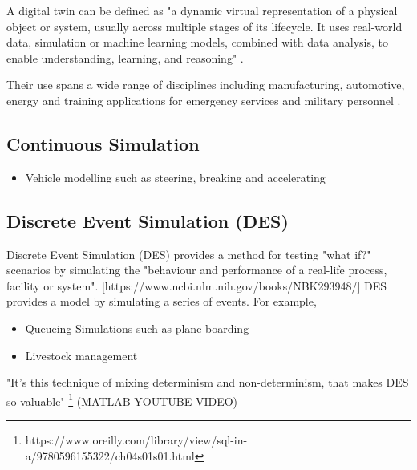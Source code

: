 \documentclass{article}
\begin{document}
A digital twin can be defined as "a dynamic virtual representation of a physical object or system, usually across multiple stages of its lifecycle. It uses real-world data, simulation or machine learning models, combined with data analysis, to enable understanding, learning, and reasoning" \cite{stanford2019digital}. 

Their use spans a wide range of disciplines including manufacturing, automotive, energy \cite{PYLIANIDIS2021105942}
 and training applications for emergency services \cite{ScientificReports1} and military personnel \cite{9345490}. 

\subsection{Continuous Simulation}


\begin{itemize}
  \item Vehicle modelling such as steering, breaking and accelerating
\end{itemize}

\subsection{Discrete Event Simulation (DES)}



Discrete Event Simulation (DES) provides a method for testing "what if?" scenarios by simulating the "behaviour and performance of a real-life process, facility or system". [https://www.ncbi.nlm.nih.gov/books/NBK293948/] DES provides a model by simulating a series of events. For example, 

\begin{itemize}
  \item Queueing Simulations such as plane boarding
  \item Livestock management
\end{itemize}

"It's this technique of mixing determinism and non-determinism, that makes DES so valuable" \footnote{https://www.oreilly.com/library/view/sql-in-a/9780596155322/ch04s01s01.html} (MATLAB YOUTUBE VIDEO)

\end{document}
